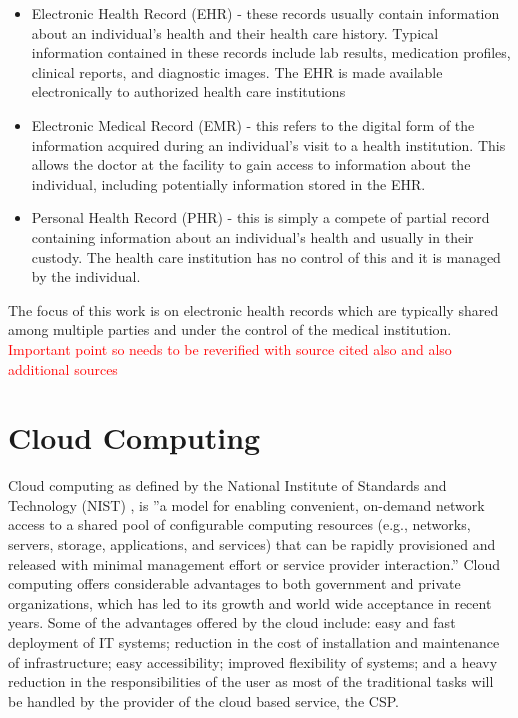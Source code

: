 \begin{itemize}
	
	\item Electronic Health Record (EHR)\cite{caninfoway} - these records usually contain information about an individual's health and their health care history. Typical information contained in these records include lab results, medication profiles, clinical reports, and diagnostic images. The EHR is made available electronically to authorized health care institutions
	
	\item Electronic Medical Record (EMR)\cite{caninfoway} - this refers to the digital form of the information acquired during an individual's visit to a health institution. This allows the doctor at the facility to gain access to information about the individual, including potentially information stored in the EHR.
	
	\item Personal Health Record (PHR)\cite{caninfoway} - this is simply a compete of partial record containing information about an individual's health and usually in their custody. The health care institution has no control of this and it is managed by the individual.
	
\end{itemize}

The focus of this work is on electronic health records which are typically shared among multiple parties and under the control of the medical institution. \textcolor{red}{Important point so needs to be reverified with source cited also and also additional sources}

\section{Cloud Computing}

Cloud computing as defined by the National Institute of Standards and Technology (NIST) \cite{nist}, is ''a model for enabling convenient, on-demand network access to a shared pool of configurable computing resources (e.g., networks, servers, storage, applications, and services) that can be rapidly provisioned and released with minimal management effort or service provider interaction.'' Cloud computing offers considerable advantages to both government and private organizations, which has led to its growth and world wide acceptance in recent years. Some of the advantages offered by the cloud include: easy and fast deployment of IT systems; reduction in the cost of installation and maintenance of infrastructure; easy accessibility; improved flexibility of systems; and a heavy reduction in the responsibilities of the user as most of the traditional tasks will be handled by the provider of the cloud based service, the CSP.

